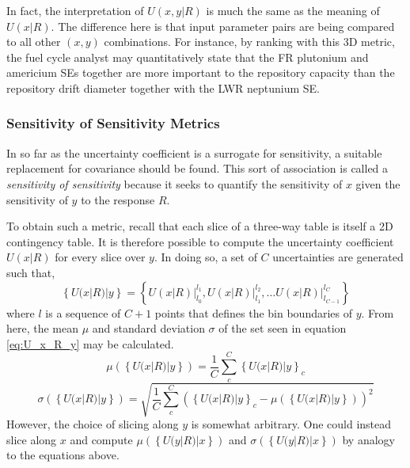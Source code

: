 \documentclass[preprint,12pt]{elsarticle}
\begin{document}
In fact, the interpretation of $U(x,y|R)$ is much the same as the meaning of $U(x|R)$.  The difference here is that input parameter pairs are being compared to
all other $(x, y)$ combinations.  For instance, by ranking with this 3D metric, the fuel cycle analyst may quantitatively state that the FR plutonium and americium SEs
together are more important to the repository capacity than the repository drift diameter together with the LWR neptunium SE.


\subsubsection{Sensitivity of Sensitivity Metrics}
\label{sec:sensitivity_of_sensitivity_metrics}

In so far as the uncertainty coefficient is a surrogate for sensitivity, a suitable replacement for covariance should be found.
This sort of association is called a \emph{sensitivity of sensitivity} because it seeks
to quantify the sensitivity of $x$ given the sensitivity of  $y$ to the response $R$.

To obtain such a metric, recall that each slice of a three-way table is itself a 2D contingency table.  It is therefore possible to compute the uncertainty
coefficient $U(x|R)$ for every slice over $y$.  In doing so, a set of $C$ uncertainties are generated such that,
\begin{equation}
\left\{U(x|R)|y\right\} = \left\{ \left.U(x|R)\right|_{l_0}^{l_1}, \left.U(x|R)\right|_{l_1}^{l_2}, \ldots \left.U(x|R)\right|_{l_{C-1}}^{l_C}  \right\}
\label{eq:U_x_R_y}
\end{equation}
where $l$ is a sequence of $C+1$ points that defines the bin boundaries of $y$.
From here, the mean $\mu$ and standard deviation $\sigma$ of the set seen in equation \ref{eq:U_x_R_y} may be 
calculated.
\begin{equation} \mu(\left\{U(x|R)|y\right\}) = \frac{1}{C} \sum_c^C \left\{U(x|R)|y\right\}_c \end{equation}
\begin{equation} \sigma(\left\{U(x|R)|y\right\}) = \sqrt{ \frac{1}{C} \sum_c^C \left( \left\{U(x|R)|y\right\}_c - \mu(\left\{U(x|R)|y\right\}) \right)^2 } \end{equation}
However, the choice of slicing along $y$ is somewhat arbitrary.  One could instead slice along $x$ and compute 
$\mu(\left\{U(y|R)|x\right\})$ and $\sigma(\left\{U(y|R)|x\right\})$
by analogy to the equations above.
\end{document}
